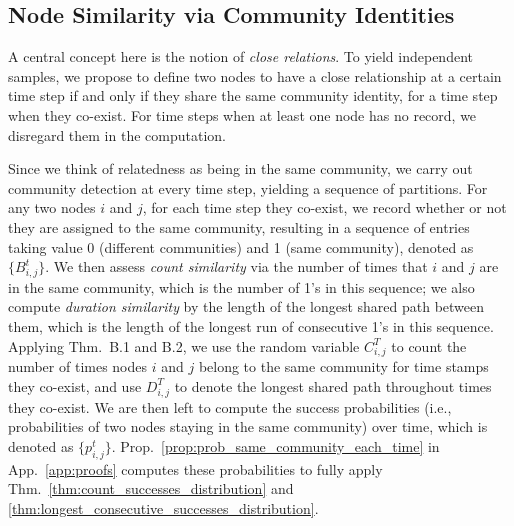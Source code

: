 \documentclass{article}
\theoremstyle{plain}
\theoremstyle{definition}
\theoremstyle{remark}
\begin{document}
\subsection{Node Similarity via Community Identities}
A central concept here is the notion of \emph{close relations}. To yield independent samples, we propose to define two nodes to have a close relationship at a certain time step if and only if they share the same community identity, for a time step when they co-exist. For time steps when at least one node has no record, we disregard them in the computation.

Since we think of relatedness as being in the same community, we carry out community detection at every time step, yielding a sequence of partitions. For any two nodes $i$ and $j$, for each time step they co-exist, we record whether or not they are assigned to the same community, resulting in a sequence of entries taking value 0 (different communities) and 1 (same community), denoted as $\{B^t_{i,j}\}$. We then assess \emph{count similarity} via the number of times that $i$ and $j$ are in the same community, which is the number of 1's in this sequence; we also compute \emph{duration similarity} by the length of the longest shared path between them, which is the length of the longest run of consecutive 1's in this sequence. Applying Thm.~B.1 and B.2, we use the random variable $C_{i,j}^{T}$ to count the number of times nodes $i$ and $j$ belong to the same community for time stamps they co-exist, and use $D_{i,j}^{T}$ to denote the longest shared path throughout times they co-exist. We are then left to compute the success probabilities (i.e., probabilities of two nodes staying in the same community) over time, which is denoted as $\{p_{i,j}^t\}.$ Prop.~\ref{prop:prob_same_community_each_time} in App.~\ref{app:proofs} computes these probabilities to fully apply Thm.~\ref{thm:count_successes_distribution} and \ref{thm:longest_consecutive_successes_distribution}.
\end{document}
